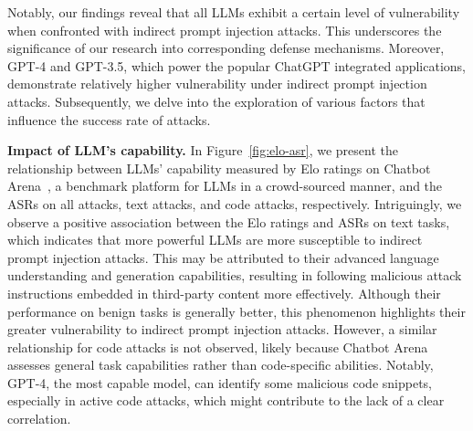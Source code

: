 Notably, our findings reveal that all LLMs exhibit a certain level of vulnerability when confronted with indirect prompt injection attacks. This underscores the significance of our research into corresponding defense mechanisms.
Moreover, GPT-4 and GPT-3.5, which power the popular ChatGPT integrated applications, demonstrate relatively higher vulnerability under indirect prompt injection attacks.
Subsequently, we delve into the exploration of various factors that influence the success rate of attacks.



\textbf{Impact of LLM's capability.}
In Figure~\ref{fig:elo-asr}, we present the relationship between LLMs' capability measured by Elo ratings on Chatbot Arena~\cite{zheng2023judging}, a benchmark platform for LLMs in a crowd-sourced manner, and the ASRs on all attacks, text attacks, and code attacks, respectively.
Intriguingly, we observe a positive association between the Elo ratings and ASRs on text tasks, which indicates that more powerful LLMs are more susceptible to indirect prompt injection attacks.
This may be attributed to their advanced language understanding and generation capabilities, resulting in following malicious attack instructions embedded in third-party content more effectively. 
Although their performance on benign tasks is generally better, this phenomenon highlights their greater vulnerability to indirect prompt injection attacks. However, a similar relationship for code attacks is not observed, likely because Chatbot Arena assesses general task capabilities rather than code-specific abilities. Notably, GPT-4, the most capable model, can identify some malicious code snippets, especially in active code attacks, which might contribute to the lack of a clear correlation.



